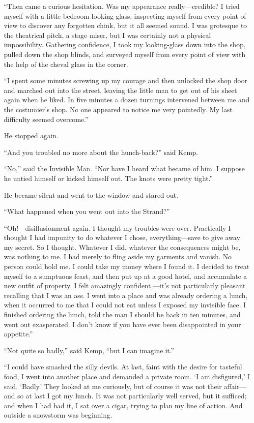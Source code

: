 “Then came a curious hesitation. Was my appearance really—credible? I tried myself with a little bedroom looking-glass, inspecting myself from every point of view to discover any forgotten chink, but it all seemed sound. I was grotesque to the theatrical pitch, a stage miser, but I was certainly not a physical impossibility. Gathering confidence, I took my looking-glass down into the shop, pulled down the shop blinds, and surveyed myself from every point of view with the help of the cheval glass in the corner.

“I spent some minutes screwing up my courage and then unlocked the shop door and marched out into the street, leaving the little man to get out of his sheet again when he liked. In five minutes a dozen turnings intervened between me and the costumier’s shop. No one appeared to notice me very pointedly. My last difficulty seemed overcome.”

He stopped again.

“And you troubled no more about the hunch-back?” said Kemp.

“No,” said the Invisible Man. “Nor have I heard what became of him. I suppose he untied himself or kicked himself out. The knots were pretty tight.”

He became silent and went to the window and stared out.

“What happened when you went out into the Strand?”

“Oh!—disillusionment again. I thought my troubles were over. Practically I thought I had impunity to do whatever I chose, everything—save to give away my secret. So I thought. Whatever I did, whatever the consequences might be, was nothing to me. I had merely to fling aside my garments and vanish. No person could hold me. I could take my money where I found it. I decided to treat myself to a sumptuous feast, and then put up at a good hotel, and accumulate a new outfit of property. I felt amazingly confident,—it’s not particularly pleasant recalling that I was an ass. I went into a place and was already ordering a lunch, when it occurred to me that I could not eat unless I exposed my invisible face. I finished ordering the lunch, told the man I should be back in ten minutes, and went out exasperated. I don’t know if you have ever been disappointed in your appetite.”

“Not quite so badly,” said Kemp, “but I can imagine it.”

“I could have smashed the silly devils. At last, faint with the desire for tasteful food, I went into another place and demanded a private room. ‘I am disfigured,’ I said. ‘Badly.’ They looked at me curiously, but of course it was not their affair—and so at last I got my lunch. It was not particularly well served, but it sufficed; and when I had had it, I sat over a cigar, trying to plan my line of action. And outside a snowstorm was beginning.

